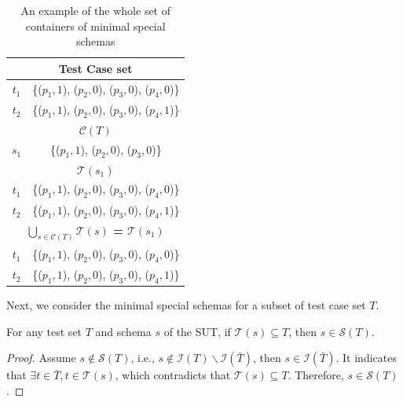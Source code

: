 \begin{table}[htbp]
  \centering
  \caption{An example of the whole set of containers of minimal special schemas}
      \label{ex:prominimalspecialschemasoftestset}
    \begin{tabular}{|c|c|} \hline
  \multicolumn{2}{|c|}{\textbf{Test Case set}} \\ \hline
  $t_{1}$ & \{($p_{1}, 1$), ($p_{2}, 0$), ($p_{3}, 0$), ($p_{4}, 0$)\}\\
  $t_{2}$ & \{($p_{1}, 1$), ($p_{2}, 0$), ($p_{3}, 0$), ($p_{4}, 1$)\}\\ \hline
  \multicolumn{2}{|c|}{\textbf{ $\mathcal{C}(T)$ }}  \\ \hline
  $s_{1}$ & \{($p_{1}, 1$), ($p_{2}, 0$), ($p_{3}, 0$)\}  \\ \hline
   \multicolumn{2}{|c|}{\textbf{ $\mathcal{T}(s_{1})$}}  \\ \hline
  $t_{1}$ & \{($p_{1}, 1$), ($p_{2}, 0$), ($p_{3}, 0$), ($p_{4}, 0$)\} \\
  $t_{2}$ & \{($p_{1}, 1$), ($p_{2}, 0$), ($p_{3}, 0$), ($p_{4}, 1$)\} \\ \hline
    \multicolumn{2}{|c|}{\textbf{  $\bigcup_{s \in \mathcal{C}(T)}\mathcal{T}(s)$ = $\mathcal{T}(s_{1})$ }}  \\ \hline
  $t_{1}$ & \{($p_{1}, 1$), ($p_{2}, 0$), ($p_{3}, 0$), ($p_{4}, 0$)\} \\
  $t_{2}$ & \{($p_{1}, 1$), ($p_{2}, 0$), ($p_{3}, 0$), ($p_{4}, 1$)\} \\ \hline
    \end{tabular}%
\end{table}%

Next, we consider the minimal special schemas for a subset of test case set $T$.

\begin{proposition} \label{pro:sbS}
 For any test set $T$ and schema $s$ of the  SUT, if $\mathcal{T}(s) \subseteq T$, then  $s \in \mathcal{S}(T) $.
\end{proposition}
\begin{proof}
 Assume $s \not\in \mathcal{S}(T)$, i.e., $s \not\in \mathcal{I}(T) \backslash \mathcal{I}(\bar{T})$, then $s \in \mathcal{I}(\bar{T})$. It indicates that $\exists t \in \bar{T}, t \in \mathcal{T}(s)$, which contradicts that $\mathcal{T}(s) \subseteq T$. Therefore, $s \in \mathcal{S}(T)$.
\end{proof}


